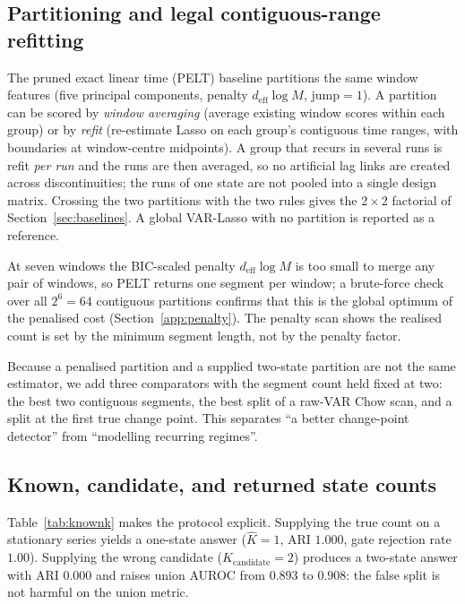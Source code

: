 \documentclass[11pt]{article}
\begin{document}
\subsection{Partitioning and legal contiguous-range refitting}
The pruned exact linear time (PELT) baseline partitions the same window
features (five principal components, penalty $d_{\mathrm{eff}}\log M$,
$\mathrm{jump}=1$). A partition
can be scored by \emph{window averaging} (average existing window scores within
each group) or by \emph{refit} (re-estimate Lasso on each group's contiguous
time ranges, with boundaries at window-centre midpoints). A group that recurs in
several runs is refit \emph{per run} and the runs are then averaged, so no
artificial lag links are created across discontinuities; the runs of one state
are not pooled into a single design matrix. Crossing the two partitions with the
two rules gives the $2\times2$ factorial of
Section~\ref{sec:baselines}. A global VAR-Lasso with no partition is reported as
a reference.

At seven windows the BIC-scaled penalty $d_{\mathrm{eff}}\log M$ is too small to
merge any pair of windows, so PELT returns one segment per window; a brute-force
check over all $2^{6}=64$ contiguous partitions confirms that this is the global
optimum of the penalised cost (Section~\ref{app:penalty}).
The penalty scan shows the realised count is set by the minimum segment length,
not by the penalty factor.

Because a penalised partition and a supplied two-state partition are not the
same estimator, we add three comparators with the segment count held fixed at
two: the best two contiguous segments, the best split of a raw-VAR Chow scan,
and a split at the first true change point. This separates ``a better
change-point detector'' from ``modelling recurring regimes''.

\subsection{Known, candidate, and returned state counts}
\label{app:knownk}

Table~\ref{tab:knownk} makes the protocol explicit. Supplying the true count on a
stationary series yields a one-state answer ($\hat K=1$, ARI $1.000$, gate
rejection rate $1.00$). Supplying the wrong candidate ($K_{\mathrm{candidate}}=2$)
produces a two-state answer with ARI $0.000$ and raises union AUROC from $0.893$
to $0.908$: the false split is not harmful on the union metric.
\end{document}
